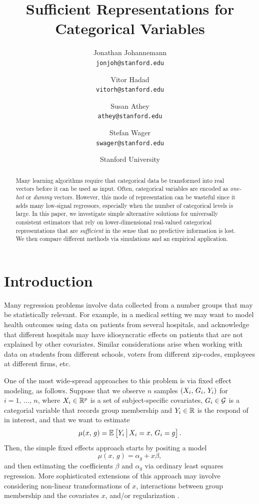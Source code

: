 \documentclass{article}
\author{Jonathan Johannemann \\ \texttt{jonjoh@stanford.edu}
\and Vitor Hadad \\ \texttt{vitorh@stanford.edu}
\and Susan Athey \\ \texttt{athey@stanford.edu}
\and Stefan Wager \\ \texttt{swager@stanford.edu}}
\date{Stanford University}
\title{Sufficient Representations for Categorical Variables}
\theoremstyle{plain}
\theoremstyle{definition}
\theoremstyle{remark}
\begin{document}
\maketitle

\begin{abstract}
    \noindent Many learning algorithms require that categorical data be transformed into real vectors before it can be used as input. Often, categorical variables are encoded as \emph{one-hot} or \emph{dummy} vectors. However, this mode of representation can be wasteful since it adds many low-signal regressors, especially when the number of categorical levels is large.  In this paper, we investigate simple alternative solutions for universally consistent estimators that rely on lower-dimensional real-valued categorical representations that are \emph{sufficient} in the sense that no predictive information is lost. We then compare different methods via simulations and an empirical application.
\end{abstract}


\section{Introduction}

Many regression problems involve data collected from a number groups that may be statistically relevant.
For example, in a medical setting we may want to model health outcomes using data on patients from
several hospitals, and acknowledge that different hospitals may have idiosyncratic effects on patients
that are not explained by other covariates. Similar considerations arise when working with data on
students from different schools, voters from different zip-codes, employees at different firms, etc.

One of the most wide-spread approaches to this problem is via fixed effect modeling,
as follows. Suppose that we observe $n$ samples $\left(X_i, \, G_i, \, Y_i\right)$
for $i = 1, \, ..., \, n$, where $X_i \in \mathbb{R}^p$ is a set of subject-specific covariates, $G_i \in \mathcal{G}$ is a categorial variable that
records group membership and $Y_i \in \mathbb{R}$ is the respond of in interest, and that we want to estimate
\begin{equation}
\label{eq:mu}
\mu(x, \, g) = \mathbb{E}_{}\left[Y_i \,\big|\, X_i = x, \, G_i = g\right].
\end{equation}
Then, the simple fixed effects approach starts by positing a model
\begin{equation}
\label{eq:FE}
\mu(x, \, g) = \alpha_g + x\beta,
\end{equation}
and then estimating the coefficients $\beta$ and $\alpha_g$ via ordinary least squares regression.
More sophisticated extensions of this approach may involve considering non-linear transformations
of $x$, interactions between group membership and the covariates $x$, and/or regularization
\citep{angrist2008mostly,diggle2002analysis,wooldridge2010econometric}.
\end{document}
